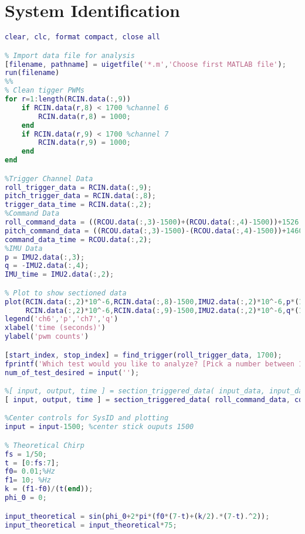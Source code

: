 \section{System Identification}\label{sec:sysid_matlab}
\begin{lstlisting}[language=matlab]
clear, clc, format compact, close all

% Import data file for analysis
[filename, pathname] = uigetfile('*.m','Choose first MATLAB file');
run(filename)
%%
% Clean tigger PWMs
for r=1:length(RCIN.data(:,9))    
    if RCIN.data(r,8) < 1700 %channel 6
        RCIN.data(r,8) = 1000;
    end
    if RCIN.data(r,9) < 1700 %channel 7
        RCIN.data(r,9) = 1000;
    end
end

%Trigger Channel Data
roll_trigger_data = RCIN.data(:,9);
pitch_trigger_data = RCIN.data(:,8);
trigger_data_time = RCIN.data(:,2);
%Command Data
roll_command_data = ((RCOU.data(:,3)-1500)+(RCOU.data(:,4)-1500))+1526;
pitch_command_data = ((RCOU.data(:,3)-1500)-(RCOU.data(:,4)-1500))+1460;
command_data_time = RCOU.data(:,2);
%IMU Data
p = IMU2.data(:,3);
q = -IMU2.data(:,4);
IMU_time = IMU2.data(:,2);

% Plot to show sectioned data
plot(RCIN.data(:,2)*10^-6,RCIN.data(:,8)-1500,IMU2.data(:,2)*10^-6,p*(180/pi),...
     RCIN.data(:,2)*10^-6,RCIN.data(:,9)-1500,IMU2.data(:,2)*10^-6,q*(180/pi))
legend('ch6','p','ch7','q')
xlabel('time (seconds)')
ylabel('pwm counts')

[start_index, stop_index] = find_trigger(roll_trigger_data, 1700);
fprintf('Which test would you like to analyze? [Pick a number between 1 and %i]\n',length(start_index));
num_of_test_desired = input('');

%[ input, output, time ] = section_triggered_data( input_data, input_data_time, output_data, output_data_time, trigger_data, trigger_time, num_of_test_desired )
[ input, output, time ] = section_triggered_data( roll_command_data, command_data_time, p, IMU_time, roll_trigger_data, trigger_data_time, num_of_test_desired );

%Center controls for SysID and plotting
input = input-1500; %center stick ouputs 1500

% Theoretical Chirp
fs = 1/50;
t = [0:fs:7];
f0= 0.01;%Hz
f1= 10; %Hz
k = (f1-f0)/(t(end));
phi_0 = 0;

input_theoretical = sin(phi_0+2*pi*(f0*(7-t)+(k/2).*(7-t).^2));
input_theoretical = input_theoretical*75;


\end{lstlisting}
